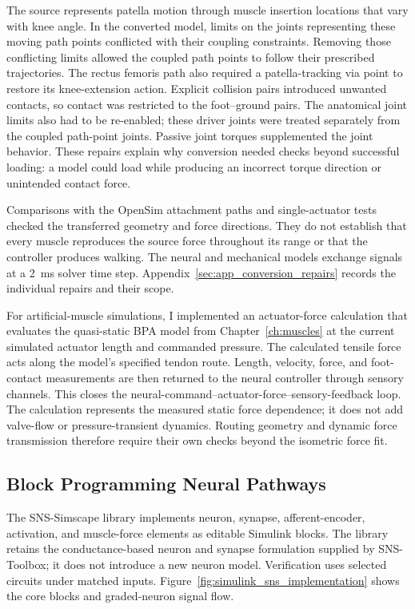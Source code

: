 The source represents patella motion through muscle insertion locations that vary with knee angle. In the converted model, limits on the joints representing these moving path points conflicted with their coupling constraints. Removing those conflicting limits allowed the coupled path points to follow their prescribed trajectories. The rectus femoris path also required a patella-tracking via point to restore its knee-extension action. Explicit collision pairs introduced unwanted contacts, so contact was restricted to the foot--ground pairs. The anatomical joint limits also had to be re-enabled; these driver joints were treated separately from the coupled path-point joints. Passive joint torques supplemented the joint behavior. These repairs explain why conversion needed checks beyond successful loading: a model could load while producing an incorrect torque direction or unintended contact force.

Comparisons with the OpenSim attachment paths and single-actuator tests checked the transferred geometry and force directions. They do not establish that every muscle reproduces the source force throughout its range or that the controller produces walking. The neural and mechanical models exchange signals at a \qty{2}{\milli\second} solver time step. Appendix~\ref{sec:app_conversion_repairs} records the individual repairs and their scope.

For artificial-muscle simulations, I implemented an actuator-force calculation that evaluates the quasi-static BPA model from Chapter~\ref{ch:muscles} at the current simulated actuator length and commanded pressure. The calculated tensile force acts along the model's specified tendon route. Length, velocity, force, and foot-contact measurements are then returned to the neural controller through sensory channels. This closes the neural-command--actuator-force--sensory-feedback loop. The calculation represents the measured static force dependence; it does not add valve-flow or pressure-transient dynamics. Routing geometry and dynamic force transmission therefore require their own checks beyond the isometric force fit.

\subsection{Block Programming Neural Pathways}\label{sec:sns_new_tools}

The SNS-Simscape library implements neuron, synapse, afferent-encoder, activation, and muscle-force elements as editable Simulink blocks. The library retains the conductance-based neuron and synapse formulation supplied by SNS-Toolbox; it does not introduce a new neuron model. Verification uses selected circuits under matched inputs. Figure~\ref{fig:simulink_sns_implementation} shows the core blocks and graded-neuron signal flow.

